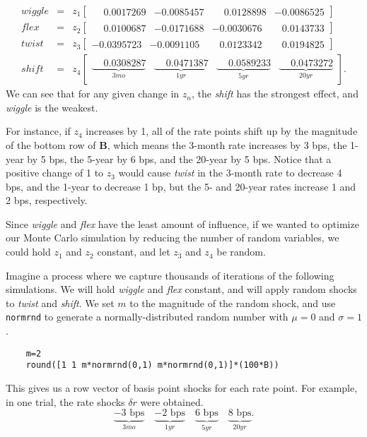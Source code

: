 \begin{eqnarray*}
wiggle &=& z_1 
\begin{bmatrix}
\phantom{-}0.0017269 & -0.0085457 & \phantom{-}0.0128898 & -0.0086525
\end{bmatrix}\\
flex &=& z_2
\begin{bmatrix}
\phantom{-}0.0100687 & -0.0171688 & -0.0030676 & \phantom{-}0.0143733
\end{bmatrix} \\
twist &=& z_3
\begin{bmatrix}
-0.0395723 & -0.0091105 & \phantom{-}0.0123342 & \phantom{-}0.0194825
\end{bmatrix} \\
shift &=& z_4
\begin{bmatrix}
\underbrace{\phantom{-}0.0308287}_{3mo} & \underbrace{\phantom{-}0.0471387}_{1yr} & \underbrace{\phantom{-}0.0589233}_{5yr} & \underbrace{\phantom{-}0.0473272}_{20yr}
\end{bmatrix}.
\end{eqnarray*}
We can see that for any given change in $z_n$, the \emph{shift} has the strongest effect, and \emph{wiggle} is the weakest.

For instance, if $z_4$ increases by 1, all of the rate points shift up by the magnitude of the bottom row of $\mathbf{B}$, which means the 3-month rate increases by 3 bps, the 1-year by 5 bps, the 5-year by 6 bps, and the 20-year by 5 bps. Notice that a positive change of 1 to $z_3$ would cause \emph{twist} in the 3-month rate to decrease 4 bps, and the 1-year to decrease 1 bp, but the 5- and 20-year rates increase 1 and 2 bps, respectively.

Since \emph{wiggle} and \emph{flex} have the least amount of influence, if we wanted to optimize our Monte Carlo simulation by reducing the number of random variables, we could hold $z_1$ and $z_2$ constant, and let $z_3$ and $z_4$ be random.

Imagine a process where we capture thousands of iterations of the following simulations. We will hold \emph{wiggle} and \emph{flex} constant, and will apply random shocks to \emph{twist} and \emph{shift}. We set $m$ to the magnitude of the random shock, and use \texttt{normrnd} to generate a normally-distributed random number with $\mu=0$ and $\sigma=1$.
\begin{verbatim}
    m=2
    round([1 1 m*normrnd(0,1) m*normrnd(0,1)]*(100*B))
\end{verbatim}
This gives us a row vector of basis point shocks for each rate point. For example, in one trial, the rate shocks $\delta r$ were obtained.
\[
\underbrace{-3 \text{ bps}}_{3mo} \quad \underbrace{-2 \text{ bps}}_{1yr} \quad \underbrace{6 \text{ bps}}_{5yr} \quad \underbrace{8 \text{ bps}}_{20yr}.
\]
